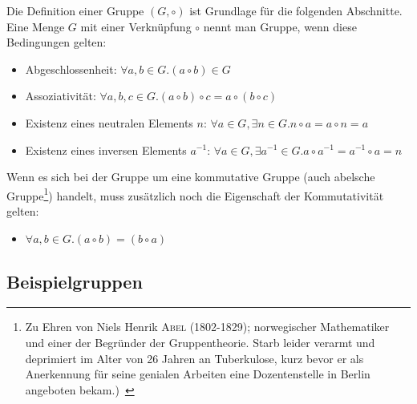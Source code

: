 \documentclass[12pt,a4paper, usenames, dvipsnames]{article}
\begin{document}
Die Definition einer Gruppe $(G, \circ)$ ist Grundlage für die folgenden Abschnitte. Eine Menge $G$ mit einer Verknüpfung $\circ$ nennt man Gruppe, wenn diese Bedingungen gelten: 
\begin{itemize}
\item Abgeschlossenheit: $\forall a,b \in G.(a \circ b) \in G $
\item Assoziativität: $\forall a,b,c \in G.(a \circ b) \circ c = a \circ (b \circ c)$
\item Existenz eines neutralen Elements $n$: $\forall a \in G, \exists n \in G.n \circ a = a \circ n = a$ 
\item Existenz eines inversen Elements $a^{-1}$: $\forall a \in G, \exists a^{-1} \in G. a \circ a^{-1} = a^{-1} \circ a = n$ 
\end{itemize}
Wenn es sich bei der Gruppe um eine kommutative Gruppe (auch abelsche Gruppe\footnote{\glqq Zu Ehren von Niels Henrik \textsc{Abel} (1802-1829); norwegischer Mathematiker und einer der Begründer der Gruppentheorie. Starb leider verarmt und deprimiert im Alter von 26 Jahren an Tuberkulose, kurz bevor er als Anerkennung für seine genialen Arbeiten  eine Dozentenstelle in Berlin angeboten bekam.)\grqq \  \cite[S.21, Z.23]{Buch}}) handelt, muss zusätzlich noch die Eigenschaft der Kommutativität gelten: 
\begin{itemize}
\item $\forall a,b \in G.(a \circ b) = (b \circ a) $
\end{itemize}
%
%
%
%
%
%
%
%
%
%
%
%
\subsection*{Beispielgruppen} 
\end{document}
